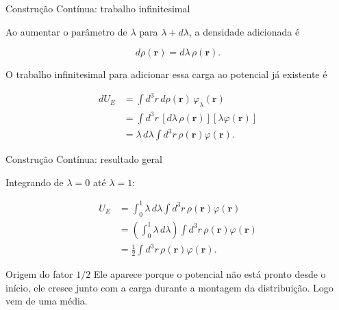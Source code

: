 \documentclass[aspectratio=169,11pt]{beamer}
\begin{document}
\begin{frame}{Construção Contínua: trabalho infinitesimal}

Ao aumentar o parâmetro de $\lambda$ para $\lambda+d\lambda$, a densidade adicionada é

\begin{eqbox}
\begin{equation}
d\rho(\mathbf r)=d\lambda\,\rho(\mathbf r).
\label{eq:drho_lambda}
\end{equation}
\end{eqbox}

O trabalho infinitesimal para adicionar essa carga ao potencial já existente é

\begin{eqbox}
\begin{align}
dU_E
&=
\int d^3r\, d\rho(\mathbf r)\,\varphi_\lambda(\mathbf r)
\nonumber\\
&=
\int d^3r\,
\left[d\lambda\,\rho(\mathbf r)\right]
\left[\lambda\varphi(\mathbf r)\right]
\nonumber\\
&=
\lambda\,d\lambda
\int d^3r\,\rho(\mathbf r)\varphi(\mathbf r).
\label{eq:dU_lambda}
\end{align}
\end{eqbox}

\end{frame}

\begin{frame}{Construção Contínua: resultado geral}

Integrando de $\lambda=0$ até $\lambda=1$:

\begin{eqbox}
\begin{align}
U_E
&=
\int_0^1
\lambda\,d\lambda
\int d^3r\,\rho(\mathbf r)\varphi(\mathbf r)
\nonumber\\
&=
\left(\int_0^1 \lambda\,d\lambda\right)
\int d^3r\,\rho(\mathbf r)\varphi(\mathbf r)
\nonumber\\
&=
\frac{1}{2}
\int d^3r\,\rho(\mathbf r)\varphi(\mathbf r).
\tag{3.78}
\end{align}
\end{eqbox}

\begin{alertblock}{Origem do fator $1/2$}
Ele aparece porque o potencial não está pronto desde o início, ele cresce junto com a carga durante a montagem da distribuição. Logo vem de uma média.
\end{alertblock}

\end{frame}
\end{document}
